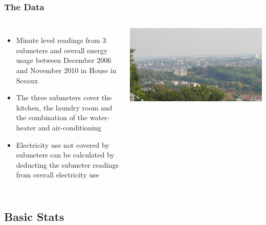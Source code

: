 \documentclass[10pt]{beamer}
\begin{document}
\begin{frame}
\frametitle{The Data}

\begin{columns}[c] %


\begin{itemize}
    \item Minute level readings from 3 submeters and overall energy usage between December 2006 and November 2010 in House in Sceaux
    \item The three submeters cover the kitchen, the laundry room and the combination of the water-heater and air-conditioning
    \item Electricity use not covered by submeters can be calculated by deducting the submeter readings from overall electricity use
\end{itemize}


\bigskip
{
    \centering
    \includegraphics[width=\textwidth,height=\textheight,keepaspectratio]{sceaux.jpg}
    \par
}
\bigskip

\end{columns}

\end{frame}

\subsection{Basic Stats}
\end{document}
